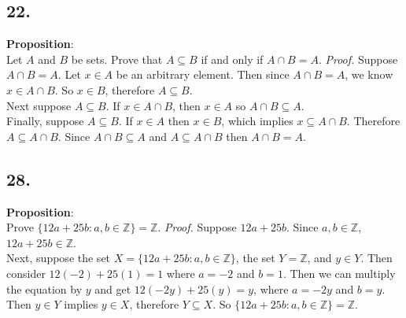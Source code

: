 \documentclass[12pt]{article}
\begin{document}
\begin{minipage}[t]{0.45\textwidth}
	
\subsection*{22.}
\textbf{Proposition}:  \\Let $ A $ and $ B $ be sets. Prove that $ A\subseteq B $ if and only if $ A\cap B=A $.
\newline\textit{Proof.} Suppose $ A\cap B=A $. Let $ x\in A $ be an arbitrary element. Then since $ A\cap B=A $, we know $ x\in A\cap B $. So $ x\in B $, therefore $ A\subseteq B $.
\\Next suppose $ A\subseteq B $. If $ x\in A\cap B $, then $ x\in A $ so $ A\cap B\subseteq A $.
\\Finally, suppose $ A\subseteq B $. If $ x\in A $ then $ x\in B $, which implies $ x\subseteq A\cap B $. Therefore $ A\subseteq A\cap B $. Since $ A\cap B\subseteq A  $ and $ A\subseteq A\cap B $ then $ A\cap B=A $.  


\subsection*{28.}
\textbf{Proposition}:  \\Prove $ \{12a+25b:a,b\in\mathbb{Z} \}=\mathbb{Z} $.
\newline\textit{Proof.} Suppose $ 12a+25b $. Since $ a,b\in\mathbb{Z} $,$  12a+25b\in\mathbb{Z}  $.
\\Next, suppose the set $ X=\{12a+25b:a,b\in\mathbb{Z} \}$, the set $ Y=\mathbb{Z} $, and $ y\in Y $. Then consider $ 12(-2)+25(1)=1 $ where $ a=-2 $ and $ b=1 $. Then we can multiply the equation by $ y $ and get $ 12(-2y)+25(y)=y $, where $ a=-2y $  and  $ b=y $. Then $ y\in Y $ implies $ y\in X $, therefore $ Y\subseteq X $. So $ \{12a+25b:a,b\in\mathbb{Z} \}=\mathbb{Z} $. 
	

\end{minipage}
\pagebreak

\end{document}
